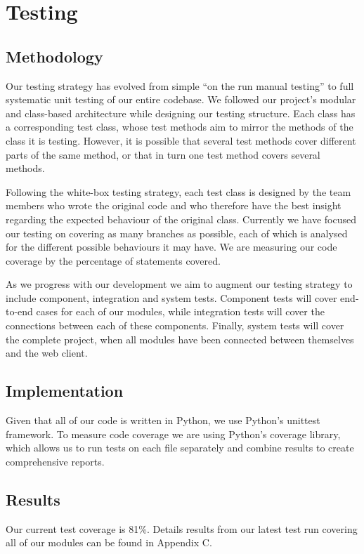 \documentclass[a4paper,11pt]{article}
\begin{document}
\section{Testing}

\subsection{Methodology}
Our testing strategy has evolved from simple ``on the run manual testing'' to full systematic unit testing of our entire codebase. We followed our project's modular and class-based architecture while designing our testing structure. Each class has a corresponding test class, whose test methods aim to mirror the methods of the class it is testing. However, it is possible that several test methods cover different parts of the same method, or that in turn one test method covers several methods.

Following the white-box testing strategy, each test class is designed by the team members who wrote the original code and who therefore have the best insight regarding the expected behaviour of the original class. Currently we have focused our testing on covering as many branches as possible, each of which is analysed for the different possible behaviours it may have. We are measuring our code coverage by the percentage of statements covered. 

As we progress with our development we aim to augment our testing strategy to include component, integration and system tests. Component tests will cover end-to-end cases for each of our modules, while integration tests will cover the connections between each of these components. Finally, system tests will cover the complete project, when all modules have been connected between themselves and the web client.

\subsection{Implementation}
Given that all of our code is written in Python, we use Python's unittest framework. To measure code coverage we are using Python's coverage library, which allows us to run tests on each file separately and combine results to create comprehensive reports.

\subsection{Results}
Our current test coverage is 81\%. Details results from our latest test run covering all of our modules can be found in Appendix C.
\end{document}
